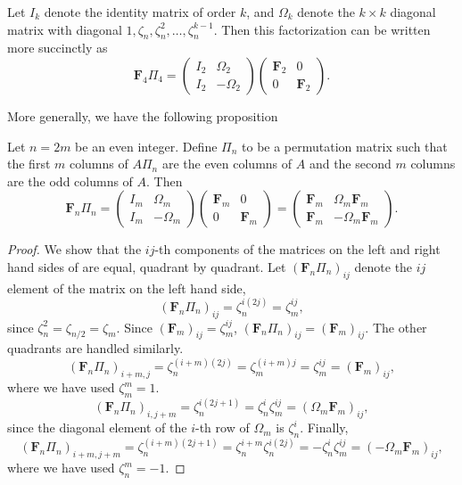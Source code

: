 Let $I_k$ denote the identity matrix of order $k$, and
$\Omega_k$ denote the $k\times k$ diagonal matrix with diagonal $1,
\zeta_n, \zeta_n^2, \ldots, \zeta_n^{k-1}$.  Then this
factorization can be written more succinctly as
\[
\mathbf{F}_4 \Pi_4 =
\left(\!\!\begin{array}{cc}I_2 & \Omega_2 \\ I_2 & -\Omega_2\end{array}\!\!\right)
\left(\!\!\begin{array}{cc}\mathbf{F}_2 & 0 \\ 0 & \mathbf{F}_2\end{array}\!\!\right).
\]

More generally, we have the following proposition
\begin{proposition}\label{FFT:Radix2:Split:Prop}
Let $n = 2m$ be an even integer.  Define $\Pi_n$ to be a permutation
matrix such that the first $m$ columns of $A\Pi_n$ are the even
columns of $A$ and the second $m$ columns are the odd columns of $A$.
Then
\begin{equation}\label{FFT:Factor:Eq}
\mathbf{F}_{n} \Pi_{n} = 
\left(\!\!\begin{array}{cc}I_m & \Omega_m \\ I_m & -\Omega_m\end{array}\!\!\right)
\left(\!\!\begin{array}{cc}\mathbf{F}_m & 0 \\ 0 & \mathbf{F}_m\end{array}\!\!\right)
=
\left(\!\!\begin{array}{cc}
  \mathbf{F}_m & \Omega_m \mathbf{F}_m \\
  \mathbf{F}_m & -\Omega_m \mathbf{F}_m 
\end{array}\!\!\right).
\end{equation}
\end{proposition}

\begin{proof}
We show that the $ij$-th components of the matrices on the left and
right hand sides of  are equal, quadrant by quadrant.
Let $(\mathbf{F}_{n} \Pi_{n})_{ij}$ denote the $ij$ element of the matrix
on the left hand side, \ie
\[
(\mathbf{F}_{n} \Pi_{n})_{ij} = \zeta_{n}^{i(2j)} = \zeta_m^{ij},
\]
since $\zeta_{n}^2 = \zeta_{n/2} = \zeta_m$.  Since $(\mathbf{F}_{m})_{ij} =
\zeta_m^{ij}$, $(\mathbf{F}_{n} \Pi_{n})_{ij} = (\mathbf{F}_{m})_{ij}$.
The other quadrants are handled similarly.
\[
(\mathbf{F}_{n} \Pi_{n})_{i+m,j}  = \zeta_{n}^{(i+m)(2j)}  =  
 \zeta_m^{(i+m)j} = \zeta_m^{ij}  =
   (\mathbf{F}_m)_{ij},
\]
where we have used $\zeta_m^m = 1$.
\[
(\mathbf{F}_{n} \Pi_{n})_{i,j+m}  =  \zeta_{n}^{i(2j+1)} = 
\zeta_{n}^i \zeta_m^{ij}  =  (\Omega_m \mathbf{F}_m)_{ij},
\]
since the diagonal element of the $i$-th row of $\Omega_m$ is
$\zeta_{n}^i$.  Finally, 
\[
(\mathbf{F}_{n} \Pi_{n})_{i+m,j+m} = \zeta_{n}^{(i+m)(2j+1)}  = 
   \zeta_{n}^{i+m} \zeta_{n}^{i(2j)} =
   - \zeta_{n}^i \zeta_m^{ij} =  (-\Omega_m \mathbf{F}_m)_{ij},
\]
where we have used $\zeta_{n}^m = -1$.
\end{proof}

